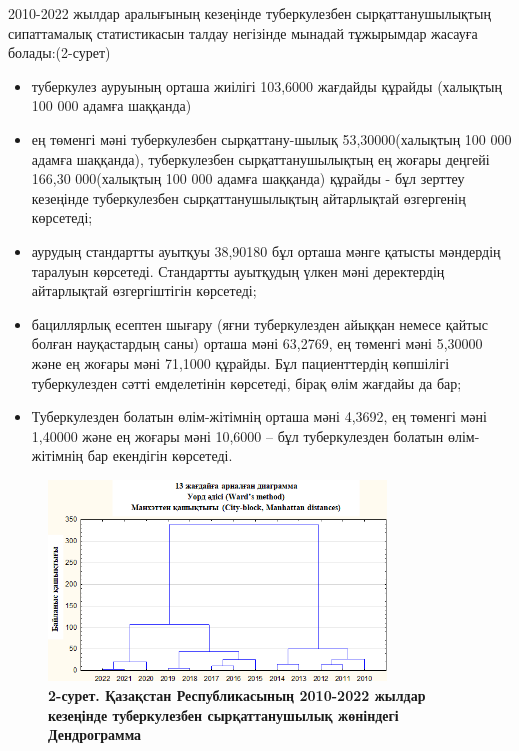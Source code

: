 \begin{multicols}{2}

2010-2022 жылдар аралығының кезеңінде туберкулезбен сырқаттанушылықтың
сипаттамалық статистикасын талдау негізінде мынадай тұжырымдар жасауға
болады:(2-сурет)

\begin{itemize}
  \setlength{\itemindent}{1cm}
\item
  туберкулез ауруының орташа жиілігі 103,6000 жағдайды құрайды (халықтың
  100 000 адамға шаққанда)
\item
  ең төменгі мәні туберкулезбен сырқаттану-шылық 53,30000(халықтың 100
  000 адамға шаққанда), туберкулезбен сырқаттанушылықтың ең жоғары
  деңгейі 166,30 000(халықтың 100 000 адамға шаққанда) құрайды - бұл
  зерттеу кезеңінде туберкулезбен сырқаттанушылықтың айтарлықтай
  өзгергенің көрсетеді;
\item
  аурудың стандартты ауытқуы 38,90180 бұл орташа мәнге қатысты мәндердің
  таралуын көрсетеді. Стандартты ауытқудың үлкен мәні деректердің
  айтарлықтай өзгергіштігін көрсетеді;
\item
  бациллярлық есептен шығару (яғни туберкулезден айыққан немесе қайтыс
  болған науқастардың саны) орташа мәні 63,2769, ең төменгі мәні 5,30000
  және ең жоғары мәні 71,1000 құрайды. Бұл пациенттердің көпшілігі
  туберкулезден сәтті емделетінін көрсетеді, бірақ өлім жағдайы да бар;
\item
  Туберкулезден болатын өлім-жітімнің орташа мәні 4,3692, ең төменгі
  мәні 1,40000 және ең жоғары мәні 10,6000 -- бұл туберкулезден болатын
  өлім-жітімнің бар екендігін көрсетеді.
\end{itemize}

\end{multicols}

\begin{figure}[H]
	\centering
	\includegraphics[width=0.8\textwidth]{assets/169}
	\caption*{\bfseries 2-сурет. Қазақстан Республикасының 2010-2022 жылдар кезеңінде
  туберкулезбен сырқаттанушылық жөніндегі Дендрограмма}
\end{figure}


